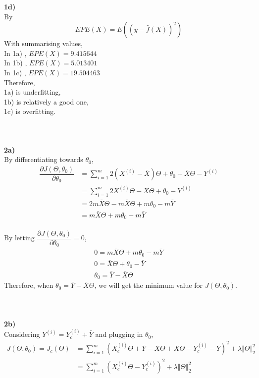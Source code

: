 \documentclass[12pt]{article}
\begin{document}
\textbf{1d)}\\
By
\[EPE(X) = E((y - \hat{f}(X))^{2})\]
With summarising values,\\
In 1a) , $EPE(X) = 9.415644$\\
In 1b) , $EPE(X) = 5.013401$\\
In 1c) , $EPE(X) = 19.504463$\\[0.2in]
Therefore,\\ 1a) is underfitting,\\ 1b) is relatively a good one,\\ 1c) is overfitting.\paragraph{\\}
\textbf{2a)}\\
By differentiating towards $\theta_{0}$,\\
\begin{align*}
\dfrac{\partial J(\Theta, \theta_{0})}{\partial \theta_{0}} &= \sum_{i=1}^{m} 2(X^{(i)} - \bar{X})\Theta + \theta_{0} + \bar{X}\Theta - Y^{(i)}\\
&= \sum_{i=1}^{m} 2X^{(i)}\Theta - \bar{X}\Theta + \theta_{0} - Y^{(i)}\\ 
&= 2m\bar{X}\Theta - m\bar{X}\Theta + m\theta_{0} - m\bar{Y}  \\
&= m\bar{X}\Theta + m\theta_{0} - m\bar{Y}
\end{align*}\\
By letting $\dfrac{\partial J(\Theta, \theta_{0})}{\partial \theta_{0}} = 0$,\\
\begin{align*}0 = m\bar{X}\Theta + m\theta_{0} - m\bar{Y}\\
0 = \bar{X}\Theta + \theta_{0} - \bar{Y}\\
\theta_{0} = \bar{Y} - \bar{X}\Theta
\end{align*}
Therefore, when $\theta_{0} = \bar{Y} - \bar{X}\Theta$, we will get the minimum value for $J(\Theta, \theta_{0})$.\paragraph{\\}
\textbf{2b)}\\
Considering $Y^{(i)} = Y^{(i)}_{c} + \bar{Y}$ and plugging in $\theta_{0}$,\\
\begin{align*}
J(\Theta, \theta_{0}) = J_{c}(\Theta) &= \sum_{i=1}^{m}(X_{c}^{(i)}\Theta + \bar{Y} - \bar{X}\Theta + \bar{X}\Theta - Y^{(i)}_{c} - \bar{Y})^{2} + \lambda\Vert\Theta\Vert_{2}^{2}\\
&= \sum_{i=1}^{m}(X_{c}^{(i)}\Theta - Y^{(i)}_{c})^{2} + \lambda\Vert\Theta\Vert_{2}^{2}
\end{align*}
\end{document}
